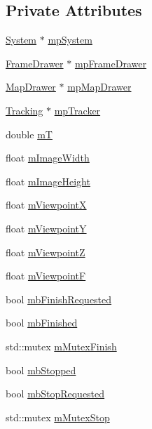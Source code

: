 \subsection*{Private Attributes}
\begin{DoxyCompactItemize}
\item 
\mbox{\hyperlink{class_o_r_b___s_l_a_m2_1_1_system}{System}} $\ast$ \mbox{\hyperlink{class_o_r_b___s_l_a_m2_1_1_viewer_aaacd5e9192cde4d09b686fb35a618eb8}{mp\+System}}
\item 
\mbox{\hyperlink{class_o_r_b___s_l_a_m2_1_1_frame_drawer}{Frame\+Drawer}} $\ast$ \mbox{\hyperlink{class_o_r_b___s_l_a_m2_1_1_viewer_ab73fa40df47dc6d5c289357e4ad1af9c}{mp\+Frame\+Drawer}}
\item 
\mbox{\hyperlink{class_o_r_b___s_l_a_m2_1_1_map_drawer}{Map\+Drawer}} $\ast$ \mbox{\hyperlink{class_o_r_b___s_l_a_m2_1_1_viewer_a924a16a3279742ec39c31dbe84b77291}{mp\+Map\+Drawer}}
\item 
\mbox{\hyperlink{class_o_r_b___s_l_a_m2_1_1_tracking}{Tracking}} $\ast$ \mbox{\hyperlink{class_o_r_b___s_l_a_m2_1_1_viewer_a2090b65a559e20262c716b57f87cf8dd}{mp\+Tracker}}
\item 
double \mbox{\hyperlink{class_o_r_b___s_l_a_m2_1_1_viewer_adb85f4094a154172711b1acf9f36c209}{mT}}
\item 
float \mbox{\hyperlink{class_o_r_b___s_l_a_m2_1_1_viewer_a90e1edcd45934303b8a968a77484dfa5}{m\+Image\+Width}}
\item 
float \mbox{\hyperlink{class_o_r_b___s_l_a_m2_1_1_viewer_a9f3df677dcd9b1c323e11e763d08bad8}{m\+Image\+Height}}
\item 
float \mbox{\hyperlink{class_o_r_b___s_l_a_m2_1_1_viewer_a30986dd20e162b6c064e6515486ae5f7}{m\+ViewpointX}}
\item 
float \mbox{\hyperlink{class_o_r_b___s_l_a_m2_1_1_viewer_a3f351e4be6077fa437a9fd59e3e179c3}{m\+ViewpointY}}
\item 
float \mbox{\hyperlink{class_o_r_b___s_l_a_m2_1_1_viewer_af73493d3e6c2d7664e8c0d7884d6a485}{m\+ViewpointZ}}
\item 
float \mbox{\hyperlink{class_o_r_b___s_l_a_m2_1_1_viewer_ada580026f9435541a53b408821a34e56}{m\+ViewpointF}}
\item 
bool \mbox{\hyperlink{class_o_r_b___s_l_a_m2_1_1_viewer_a5f31947755c29030a8aa6dd59d13256c}{mb\+Finish\+Requested}}
\item 
bool \mbox{\hyperlink{class_o_r_b___s_l_a_m2_1_1_viewer_ae7455c94e1109f9ecc8311583309390f}{mb\+Finished}}
\item 
std\+::mutex \mbox{\hyperlink{class_o_r_b___s_l_a_m2_1_1_viewer_a9633023902537fe1b320c289f6ae74fa}{m\+Mutex\+Finish}}
\item 
bool \mbox{\hyperlink{class_o_r_b___s_l_a_m2_1_1_viewer_a78d845b2b2e8d705686e88c8951296e7}{mb\+Stopped}}
\item 
bool \mbox{\hyperlink{class_o_r_b___s_l_a_m2_1_1_viewer_a8f55ae2a631d2dae1a790bcfbb1779f5}{mb\+Stop\+Requested}}
\item 
std\+::mutex \mbox{\hyperlink{class_o_r_b___s_l_a_m2_1_1_viewer_a9da4631859d306fc77736cbd5a8169d8}{m\+Mutex\+Stop}}
\end{DoxyCompactItemize}


